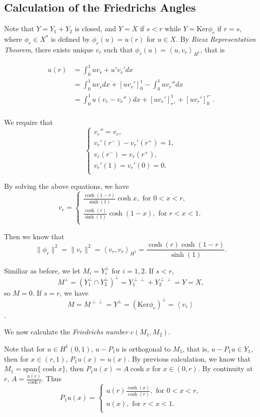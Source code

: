 \subsection{Calculation of the Friedrichs Angles}\label{sec:friedrichs_1_d_case}\hfill

Note that $Y=Y_1+Y_2$ is closed, and $Y=X$ if $s<r$ while $Y=\mathrm{Ker}\phi_r$ if $r=s$, where $\phi_r\in X^{\ast}$ is defined by $\phi_r(u)=u(r)$ for $u\in X$. By \emph{Riesz Representation Theorem}, there exists unique $v_r$ such that 
$\phi_r(u)=\left\langle u, v_r\right\rangle _{H^1}$, that is

\begin{align*}
u(r)&=\int_{0}^{1} u{v_r}+ u'{v_r}' dx\\
{}&=\int_{0}^{1} u{v_r} dx+\left[u{v_r}'\right]_{0}^{1}-\int_{0}^{1} u {v_r}''dx\\
{}&=\int_{0}^{1} u({v_r}-{v_r}'')dx+\left[u{v_r}'\right]_{r^{+}}^{1}+\left[u{v_r}'\right]_{0}^{r^{-}}.\\
\end{align*}

We require that 
$$\begin{cases}
{v_r}''=v_r, \\
{v_r}'(r^{-})-{v_r}'(r^{+})=1,\\
v_r(r^{-})=v_{r}(r^{+}),\\
{v_r}'(1)={v_r}'(0)=0.\\
\end{cases}$$ 

By solving the above equations, we have 
$${v_r}=\begin{cases}
\frac{\cosh(1-r)}{\sinh(1)}\cosh x, \mbox{ for } 0<x<r,\\
\frac{\cosh(r)}{\sinh(1)}\cosh(1-x), \mbox{ for } r<x<1.\\
\end{cases}$$ 

Then we know that $$\|\phi_r\|^2=\|v_r\|^2=\left\langle v_r,v_r\right\rangle_{H^1}=\frac{\cosh(r)\cosh(1-r)}{\sinh(1)}.$$

Similiar as before, we let $M_i=Y_{i}^{\perp}$ for $i=1,2$. If $s<r$, $$M^{\perp}=(Y_1^{\perp}\cap Y_{2}^{\perp})^{\perp}=Y_1^{\perp\perp}+Y_2^{\perp\perp}=Y=X,$$
so $M={0}$. 
If $s=r$, we have $$M=M^{\perp\perp}=Y^{\perp}=(\mathrm{Ker}\phi_r)^{\perp}=\left\langle v_r\right\rangle$$.

We now calculate the \emph{Friedrichs number} $c(M_1,M_2)$.

Note that for $u\in H^1(0,1)$, $u-P_1 u$ is orthogonal to $M_1$, that is, $u-P_1u\in Y_1$, then for $x\in (r,1)$, $P_1u(x)=u(x)$. By previous calculation, we know that $M_1=\mathrm{span}\{\cosh x\}$, then $P_1 u(x)=A \cosh x$ for $x\in (0,r)$. By continuity at $r$, $A=\frac{u(r)}{\cosh r}$. Thus
$$P_1u(x)=\begin{cases} u(r)\frac{\cosh(x)}{\cosh(r)}, \mbox{ for } 0<x<r,\\
u(x), \mbox{ for } r<x<1.\\
\end{cases}$$

